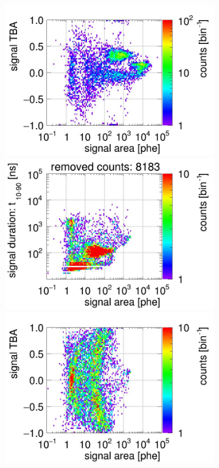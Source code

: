 \begin{landscape}
\begin{figure}[!p]
\begin{subfigure}[t]{0.32\textwidth}
		\includegraphics[width=\figurewidth,clip,trim={0 98 0 40}]{Figures/GasTest/CutsValid/res64767/tbapa05Vecfig64767.jpg}
		\includegraphics[width=\figurewidth,clip,trim={0 98 0 15}]{Figures/GasTest/CutsValid/res64767/pdpaX05Vecfig64767.jpg}
\includegraphics[width=\figurewidth,clip,trim={0 8 0 40}]{Figures/GasTest/CutsValid/res64767/tbapaX05Vecfig64767.jpg}

\end{subfigure}
\end{figure}
\end{landscape}
